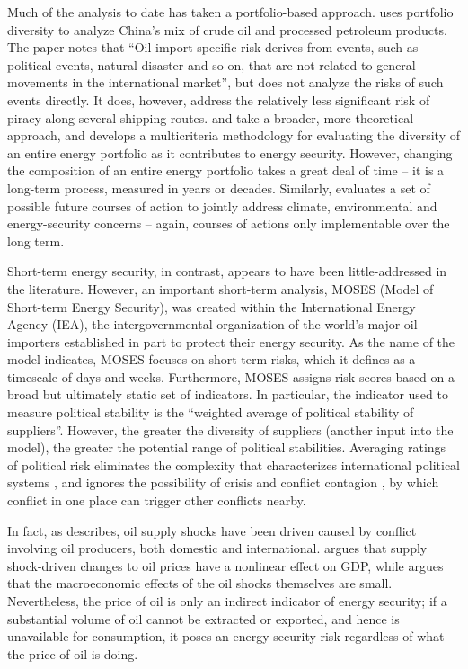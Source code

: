 \documentclass{llncs}
\begin{document}
Much of the analysis to date has taken a portfolio-based approach. \cite{wu_2009} uses portfolio diversity to analyze China's mix of crude oil and processed petroleum products. The paper notes that ``Oil import-specific risk derives from events, such as political events, natural disaster and so on, that are not related to general movements in the international market'', but does not analyze the risks of such events directly. It does, however, address the relatively less significant risk of piracy along several shipping routes. \cite{stirling_2010} and \cite{skea_2010} take a broader, more theoretical approach, and develops a multicriteria methodology for evaluating the diversity of an entire energy portfolio as it contributes to energy security. However, changing the composition of an entire energy portfolio takes a great deal of time -- it is a long-term process, measured in years or decades. Similarly, \cite{jacobson_2009} evaluates a set of possible future courses of action to jointly address climate, environmental and energy-security concerns -- again, courses of actions only implementable over the long term.

Short-term energy security, in contrast, appears to have been little-addressed in the literature. However, an important short-term analysis, MOSES (Model of Short-term Energy Security), was created within the International Energy Agency (IEA), the intergovernmental organization of the world's major oil importers established in part to protect their energy security. As the name of the model indicates, MOSES focuses on short-term risks, which it defines as a timescale of days and weeks. Furthermore, MOSES assigns risk scores based on a broad but ultimately static set of indicators. In particular, the indicator used to measure political stability is the ``weighted average of political stability of suppliers''. However, the greater the diversity of suppliers (another input into the model), the greater the potential range of political stabilities. Averaging ratings of political risk eliminates the complexity that characterizes international political systems \cite{cederman_1997,geller_2011}, and ignores the possibility of crisis and conflict contagion \cite{black_2013}, by which conflict in one place can trigger other conflicts nearby. 

In fact, as \cite{hamilton_2003} describes, oil supply shocks have been driven caused by conflict involving oil producers, both domestic and international. \cite{hamilton_2003} argues that supply shock-driven changes to oil prices have a nonlinear effect on GDP, while \cite{kilian_2008} argues that the macroeconomic effects of the oil shocks themselves are small. Nevertheless, the price of oil is only an indirect indicator of energy security; if a substantial volume of oil cannot be extracted or exported, and hence is unavailable for consumption, it poses an energy security risk regardless of what the price of oil is doing. 
\end{document}

